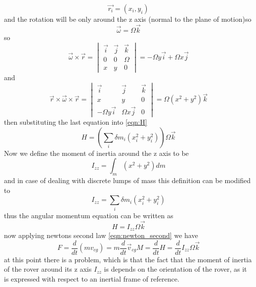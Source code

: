 \documentclass{article}
\begin{document}
	\[\vec{r_i} = \left(x_i,y_i\right)
	\]
	and the rotation will be only around the z axis (normal to the plane of motion)so
	\[\vec{\omega} = \Omega \vec{k}
	\]
	so 
	\begin{equation*}
	\vec{\omega}\times\vec{r} = \begin{vmatrix}
	\vec{i} & \vec{j} & \vec{k}\\0 & 0 & \Omega\\x& y& 0
	\end{vmatrix} = -\Omega y\vec{i} + \Omega x\vec{j}
	\end{equation*}
	and
	\begin{equation*}
	\vec{r}\times\vec{\omega}\times\vec{r} = \begin{vmatrix}
	\vec{i} & \vec{j} & \vec{k}\\x& y& 0\\-\Omega y\vec{i} & \Omega x\vec{j} & 0
	\end{vmatrix} = \Omega\left(x^2+y^2\right)\vec{k}
	\end{equation*}
	then substituting the last equation into \ref{eqn:H}
	\begin{equation}
	H = \left(\sum_{i}\delta m_i(x_{i}^{2}+y_{i}^{2})\right)\Omega\vec{k}
	\end{equation}
	Now we define the moment of inertia around the z axis to be
	\begin{equation*}
	I_{zz} = \int_{m}(x^2 + y^2)dm
	\end{equation*}
	and in case of dealing with discrete lumps of mass this definition can be modified to 
	\begin{equation*}
	I_{zz} = \sum_{i}\delta m_i(x_{i}^{2}+y_{i}^{2})
	\end{equation*}
	thus the angular momentum equation can be written as
	\begin{equation}
	H = I_{zz}\Omega \vec{k}
	\end{equation}
	now applying newtons second law \ref{eqn:newton_second} we have
	\begin{subequations}
	\begin{equation}
	F = \frac{d}{dt}\left(mv_{cg}\right) = m\frac{d}{dt}\vec{v}_{cg}
	\end{equation}
	\begin{equation}
	M = \frac{d}{dt}H = \frac{d}{dt}I_{zz}\Omega\vec{k}
	\end{equation}
	\end{subequations}
	at this point there is a problem, which is that the fact that the moment of inertia of the rover around its z axis $I_{zz}$ is depends on the orientation of the rover, as it is expressed with respect to an inertial frame of reference.
\end{document}
